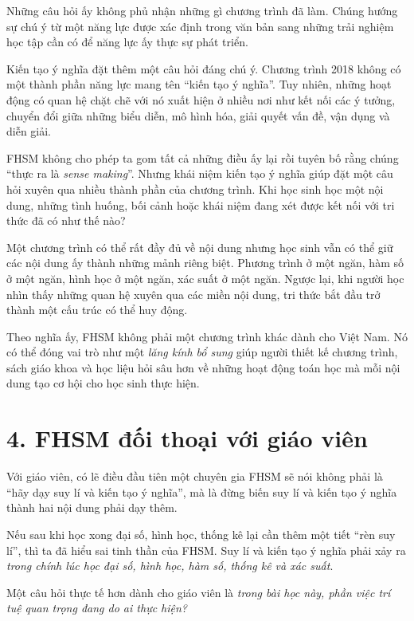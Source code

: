 Những câu hỏi ấy không phủ nhận những gì chương trình đã làm. Chúng hướng sự chú ý từ một năng lực được xác định trong văn bản sang những trải nghiệm học tập cần có để năng lực ấy thực sự phát triển.

Kiến tạo ý nghĩa đặt thêm một câu hỏi đáng chú ý. Chương trình 2018 không có một thành phần năng lực mang tên ``kiến tạo ý nghĩa''. Tuy nhiên, những hoạt động có quan hệ chặt chẽ với nó xuất hiện ở nhiều nơi như kết nối các ý tưởng, chuyển đổi giữa những biểu diễn, mô hình hóa, giải quyết vấn đề, vận dụng và diễn giải.

FHSM không cho phép ta gom tất cả những điều ấy lại rồi tuyên bố rằng chúng ``thực ra là \emph{sense making}''. Nhưng khái niệm kiến tạo ý nghĩa giúp đặt một câu hỏi xuyên qua nhiều thành phần của chương trình. Khi học sinh học một nội dung, những tình huống, bối cảnh hoặc khái niệm đang xét được kết nối với tri thức đã có như thế nào?

Một chương trình có thể rất đầy đủ về nội dung nhưng học sinh vẫn có thể giữ các nội dung ấy thành những mảnh riêng biệt. Phương trình ở một ngăn, hàm số ở một ngăn, hình học ở một ngăn, xác suất ở một ngăn. Ngược lại, khi người học nhìn thấy những quan hệ xuyên qua các miền nội dung, tri thức bắt đầu trở thành một cấu trúc có thể huy động.

Theo nghĩa ấy, FHSM không phải một chương trình khác dành cho Việt Nam. Nó có thể đóng vai trò như một \emph{lăng kính bổ sung} giúp người thiết kế chương trình, sách giáo khoa và học liệu hỏi sâu hơn về những hoạt động toán học mà mỗi nội dung tạo cơ hội cho học sinh thực hiện.


\section*{4. FHSM đối thoại với giáo viên}

Với giáo viên, có lẽ điều đầu tiên một chuyên gia FHSM sẽ nói không phải là ``hãy dạy suy lí và kiến tạo ý nghĩa'', mà là đừng biến suy lí và kiến tạo ý nghĩa thành hai nội dung phải dạy thêm.

Nếu sau khi học xong đại số, hình học, thống kê lại cần thêm một tiết ``rèn suy lí'', thì ta đã hiểu sai tinh thần của FHSM. Suy lí và kiến tạo ý nghĩa phải xảy ra \emph{trong chính lúc học đại số, hình học, hàm số, thống kê và xác suất}.

Một câu hỏi thực tế hơn dành cho giáo viên là \emph{trong bài học này, phần việc trí tuệ quan trọng đang do ai thực hiện?}

